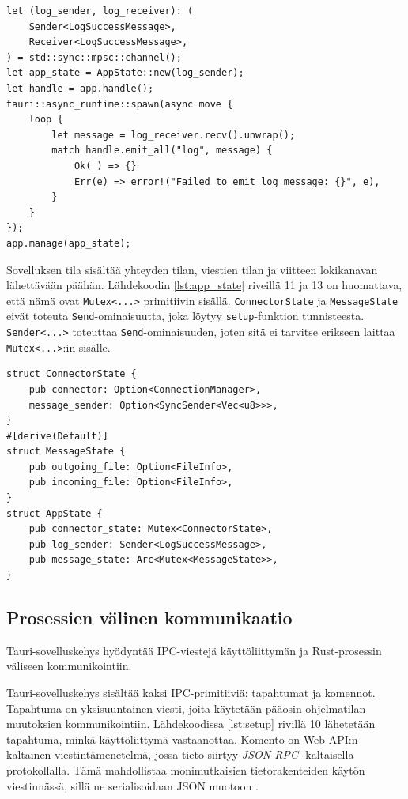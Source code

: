 \documentclass[a4paper,12pt]{article}
\begin{document}
    \begin{lstlisting}[caption={setup-sulkeuma}, label={lst:setup}]
let (log_sender, log_receiver): (
    Sender<LogSuccessMessage>,
    Receiver<LogSuccessMessage>,
) = std::sync::mpsc::channel();
let app_state = AppState::new(log_sender);
let handle = app.handle();
tauri::async_runtime::spawn(async move {
    loop {
        let message = log_receiver.recv().unwrap();
        match handle.emit_all("log", message) {
            Ok(_) => {}
            Err(e) => error!("Failed to emit log message: {}", e),
        }
    }
});
app.manage(app_state);\end{lstlisting}

    Sovelluksen tila sisältää yhteyden tilan, viestien tilan ja viitteen lokikanavan lähettävään päähän. Lähdekoodin \ref{lst:app_state} riveillä 11 ja 13 on huomattava, että nämä ovat \lstinline{Mutex<...>} primitiivin sisällä. \lstinline{ConnectorState} ja \lstinline{MessageState} eivät toteuta \lstinline{Send}-ominaisuutta, joka löytyy \lstinline{setup}-funktion tunnisteesta. \lstinline{Sender<...>} toteuttaa \lstinline{Send}-ominaisuuden, joten sitä ei tarvitse erikseen laittaa \lstinline{Mutex<...>}:in sisälle.
    
    \begin{lstlisting}[caption={Sovelluksen tilan rakenne}, label={lst:app_state}]
struct ConnectorState {
    pub connector: Option<ConnectionManager>,
    message_sender: Option<SyncSender<Vec<u8>>>,
}
#[derive(Default)]
struct MessageState {
    pub outgoing_file: Option<FileInfo>,
    pub incoming_file: Option<FileInfo>,
}
struct AppState {
    pub connector_state: Mutex<ConnectorState>,
    pub log_sender: Sender<LogSuccessMessage>,
    pub message_state: Arc<Mutex<MessageState>>,
}\end{lstlisting}

    \subsection{Prosessien välinen kommunikaatio}
    Tauri-sovelluskehys hyödyntää IPC-viestejä käyttöliittymän ja Rust-prosessin väliseen kommunikointiin.

    Tauri-sovelluskehys sisältää kaksi IPC-primitiiviä: tapahtumat ja komennot.
    Tapahtuma on yksisuuntainen viesti, joita käytetään pääosin ohjelmatilan muutoksien kommunikointiin. Lähdekoodissa \ref{lst:setup} rivillä 10 lähetetään tapahtuma, minkä käyttöliittymä vastaanottaa. Komento on Web API:n kaltainen viestintämenetelmä, jossa tieto siirtyy \textit{JSON-RPC} -kaltaisella protokollalla. Tämä mahdollistaa monimutkaisien tietorakenteiden käytön viestinnässä, sillä ne serialisoidaan JSON muotoon \cite{tauri-app}.
\end{document}
